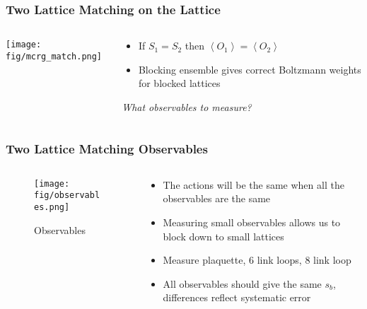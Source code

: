 \begin{frame}
  \frametitle{Two Lattice Matching on the Lattice}
  \begin{columns}[T]
    \begin{column}{.4\textwidth}
      \texttt{[image: fig/mcrg\_match.png]}
    \end{column}
    \begin{column}{.6\textwidth}
      \begin{itemize}
        \item If $S_1=S_2$ then $\left<O_1\right>=\left<O_2\right>$\\
        \item Blocking ensemble gives correct Boltzmann weights for blocked lattices
      \end{itemize}
      \vspace{32pt}
    \begin{center}\emph{What observables to measure?}\end{center}
    \end{column}
  \end{columns}
\end{frame}

\begin{frame}
  \frametitle{Two Lattice Matching Observables}
  \begin{columns}[T]
    \begin{column}{.5\textwidth}
      \begin{figure}
        \texttt{[image: fig/observables.png]}
        \caption{Observables}
      \end{figure}
    \end{column}
    \begin{column}{.5\textwidth}
      \begin{block}{}
        \begin{itemize}
          \item The actions will be the same when all the observables are the same
          \item Measuring small observables allows us to block down to small lattices
          \item Measure plaquette, 6 link loops, 8 link loop
          \item All observables should give the same $s_b$, differences reflect systematic error
        \end{itemize}
      \end{block}
    \end{column}
  \end{columns}
\end{frame}

